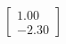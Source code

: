 \documentclass[preview]{standalone}
\begin{document}
\begin{align*}
\begin{bmatrix} 1.00 \\ -2.30 \end{bmatrix}
\end{align*}
\end{document}

